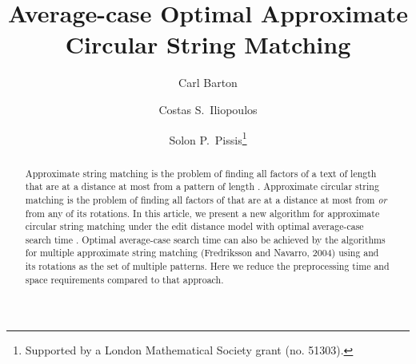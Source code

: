 \documentclass[runningheads, envcountsame, a4paper]{llncs}\usepackage{etex}
\begin{document}
\frontmatter          \title{Average-case Optimal Approximate Circular String Matching}

\author{Carl Barton
\and Costas S.\ Iliopoulos
\and Solon P.\ Pissis\thanks{Supported by a London Mathematical Society grant (no. 51303).}
}



\maketitle

\begin{abstract}
Approximate string matching is the problem of finding all factors of a text  of length 
that are at a distance at most  from a pattern  of length . 
Approximate circular string matching is the problem of finding all factors of 
that are at a distance at most  from  {\em or} from any of its rotations. 
In this article, we present a new algorithm for approximate circular string matching under the edit distance model with optimal average-case search time .
Optimal average-case search time can also be achieved by the algorithms for multiple approximate string matching (Fredriksson and Navarro, 2004) using
 and its rotations as the set of multiple patterns. Here we reduce the preprocessing time and space requirements compared to that approach.
\end{abstract}
\end{document}

